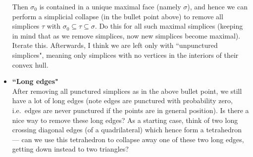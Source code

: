 \documentclass[amscd, amssymb, verbatim]{amsart}[12pt]
\theoremstyle{plain}
\theoremstyle{definition}
\begin{document}
\begin{itemize}
Then $\sigma_0$ is contained in a unique maximal face (namely $\sigma$), and hence we can perform a simplicial collapse (in the bullet point above) to remove all simplices $\tau$ with $\sigma_0\subseteq \tau\subseteq \sigma$. Do this for all such maximal simplices (keeping in mind that as we remove simplices, now new simplices become maximal). 
Iterate this. Afterwards, I think we are left only with ``unpunctured simplices", meaning only simplices with no vertices in the interiors of their convex hull. 
\item \textbf{``Long edges"} \\
After removing all punctured simplices as in the above bullet point, we still have a lot of long edges (note edges are punctured with probability zero, i.e.\ edges are never punctured if the points are in general position).
Is there a nice way to remove these long edges?
As a starting case, think of two long crossing diagonal edges (of a quadrilateral) which hence form a tetrahedron --- can we use this tetrahedron to collapse away one of these two long edges, getting down instead to two triangles?
\end{itemize}






\end{document}
